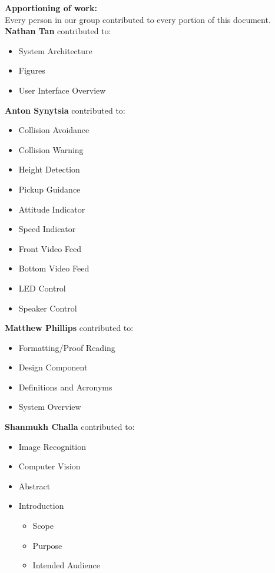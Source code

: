 \documentclass[onecolumn, oneside, letterpaper, draftclsnofoot, 10pt, compsoc]{IEEEtran}
\begin{document}
\newpage
{}
\tableofcontents
\listoffigures
\clearpage

\noindent\textbf{Apportioning of work:}\\
\noindent Every person in our group contributed to every portion of this document.\\

\noindent\textbf{Nathan Tan} contributed to:
\begin{itemize}
    \item System Architecture
    \item Figures
    \item User Interface Overview
\end{itemize}

\noindent\textbf{Anton Synytsia} contributed to:
\begin{itemize}
    \item Collision Avoidance
    \item Collision Warning
    \item Height Detection
    \item Pickup Guidance
    \item Attitude Indicator
    \item Speed Indicator
    \item Front Video Feed
    \item Bottom Video Feed
    \item LED Control
    \item Speaker Control
\end{itemize}

\noindent\textbf{Matthew Phillips} contributed to:
\begin{itemize}
  \item Formatting/Proof Reading
  \item Design Component
  \item Definitions and Acronyms
  \item System Overview
\end{itemize}

\noindent\textbf{Shanmukh Challa} contributed to:
\begin{itemize}
  \item Image Recognition
  \item Computer Vision
  \item Abstract
  \item Introduction
  \begin{itemize}
    \item Scope
    \item Purpose
    \item Intended Audience
  \end{itemize}
\end{itemize}
\end{document}
